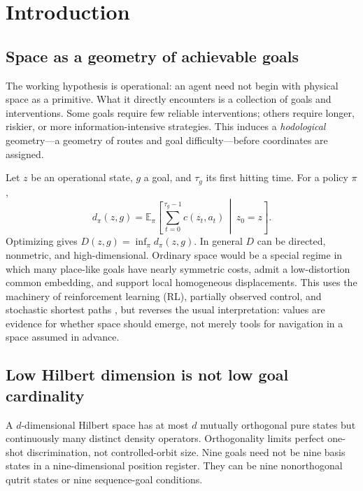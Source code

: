\documentclass[11pt]{article}
\theoremstyle{definition}\newtheorem{definition}[theorem]{Definition}
\theoremstyle{remark}\newtheorem{remark}[theorem]{Remark}
\newcommand{\E}{\mathbb E}
\begin{document}
\tableofcontents
\newpage

\section{Introduction}
\label{sec:introduction}

\subsection{Space as a geometry of achievable goals}

The working hypothesis is operational: an agent need not begin with physical
space as a primitive. What it directly encounters is a collection of goals
and interventions. Some goals require few reliable interventions; others
require longer, riskier, or more information-intensive strategies. This
induces a \emph{hodological} geometry---a geometry of routes and goal
difficulty---before coordinates are assigned.

Let \(z\) be an operational state, \(g\) a goal, and \(\tau_g\) its first
hitting time. For a policy \(\pi\),
\begin{equation}
d_\pi(z,g)=\E_\pi\left[
\sum_{t=0}^{\tau_g-1}c(z_t,a_t)\,\middle|\,z_0=z\right].
\label{eq:policy-cost}
\end{equation}
Optimizing gives \(D(z,g)=\inf_\pi d_\pi(z,g)\). In general \(D\) can be
directed, nonmetric, and high-dimensional. Ordinary space would be a special
regime in which many place-like goals have nearly symmetric costs, admit a
low-distortion common embedding, and support local homogeneous displacements.
This uses the machinery of reinforcement learning (RL), partially observed
control, and stochastic shortest paths \cite{bellman1957,puterman1994,
sutton2018,kaelbling1998}, but reverses the usual interpretation: values are
evidence for whether space should emerge, not merely tools for navigation in a
space assumed in advance.

\subsection{Low Hilbert dimension is not low goal cardinality}

A \(d\)-dimensional Hilbert space has at most \(d\) mutually orthogonal pure
states but continuously many distinct density operators. Orthogonality limits
perfect one-shot discrimination, not controlled-orbit size. Nine goals need
not be nine basis states in a nine-dimensional position register. They can be
nine nonorthogonal qutrit states or nine sequence-goal conditions.
\end{document}
